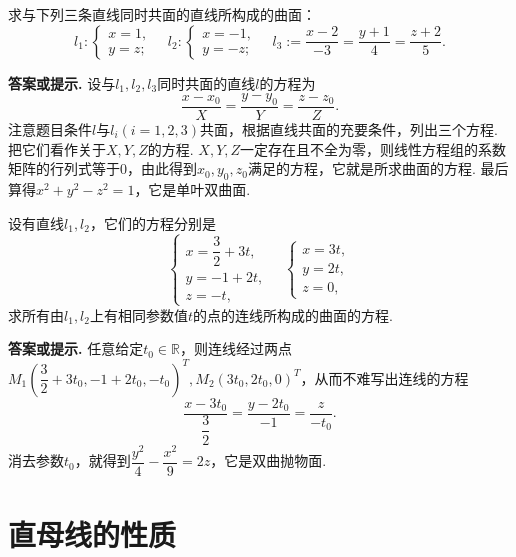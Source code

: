\documentclass[12pt, a4paper,newtx]{ctexart}
\newenvironment{hint}{\textbf{答案或提示. }}{}{}
\begin{document}
\begin{example}{}{}
	求与下列三条直线同时共面的直线所构成的曲面：\[l_1:\begin{cases}
		x=1,\\y=z;
	\end{cases}\quad l_2:\begin{cases}
	x=-1,\\y=-z;
	\end{cases}\quad l_3:=\dfrac{x-2}{-3}=\dfrac{y+1}{4}=\dfrac{z+2}{5}.\]
\end{example}
\begin{hint}
	设与$l_1,l_2,l_3$同时共面的直线$l$的方程为\[\frac{x-x_0}{X}=\dfrac{y-y_0}{Y}=\dfrac{z-z_0}{Z}.\]注意题目条件$l$与$l_i(i=1,2,3)$共面，根据直线共面的充要条件，列出三个方程. 把它们看作关于$X,Y,Z$的方程. $X,Y,Z$一定存在且不全为零，则线性方程组的系数矩阵的行列式等于0，由此得到$x_0,y_0,z_0$满足的方程，它就是所求曲面的方程. 最后算得$x^2+y^2-z^2=1$，它是单叶双曲面. 
\end{hint}
\begin{example}{}{}
	设有直线$l_1,l_2$，它们的方程分别是\[\begin{cases}
		x=\dfrac{3}{2}+3t,\\y=-1+2t,\\z=-t,
	\end{cases}\quad\begin{cases}
	x=3t,\\y=2t,\\z=0,
	\end{cases}\]求所有由$l_1,l_2$上有相同参数值$t$的点的连线所构成的曲面的方程. 
\end{example}
\begin{hint}
	任意给定$t_0\in\mathbb{R}$，则连线经过两点$M_1\left(\dfrac{3}{2}+3t_0,-1+2t_0,-t_0\right)^T,M_2\left(3t_0,2t_0,0\right)^T$，从而不难写出连线的方程\[\frac{x-3t_0}{\dfrac32}=\dfrac{y-2t_0}{-1}=\dfrac{z}{-t_0}.\]消去参数$t_0$，就得到$\dfrac{y^2}{4}-\dfrac{x^2}{9}=2z$，它是双曲抛物面. 
\end{hint}
\section{直母线的性质}
\end{document}
